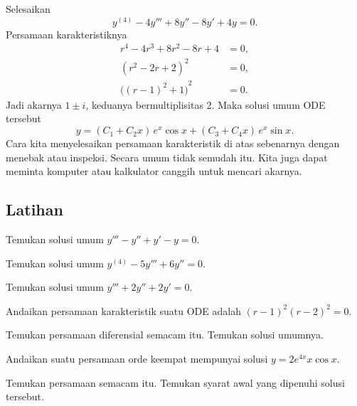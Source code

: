\begin{example}
Selesaikan
\begin{equation*}
y^{(4)} - 4 y''' + 8 y'' - 8 y' + 4y = 0 .
\end{equation*}
Persamaan karakteristiknya
\begin{align*}
r^4 - 4 r^3 + 8 r^2 - 8 r + 4 & = 0 , \\
{(r^2-2r+2)}^2 & = 0 , \\
{\bigl({(r-1)}^2+1\bigr)}^2 & = 0 .
\end{align*}
Jadi akarnya $1 \pm i$, keduanya bermultiplisitas 2. Maka solusi umum ODE tersebut
\begin{equation*}
y =
( C_1 + C_2 x ) \, e^{x} \cos x
+
( C_3 + C_4 x ) \, e^{x} \sin x .
\end{equation*}
Cara kita menyelesaikan persamaan karakteristik di atas sebenarnya dengan menebak atau inspeksi. Secara umum tidak semudah itu. Kita juga dapat meminta komputer atau kalkulator canggih untuk mencari akarnya.
\end{example}


\subsection{Latihan}

\begin{exercise}
Temukan solusi umum $y''' - y'' + y' - y = 0$.
\end{exercise}

\begin{exercise}
Temukan solusi umum $y^{(4)} - 5 y''' + 6 y'' = 0$.
\end{exercise}

\begin{exercise}
Temukan solusi umum $y''' + 2 y'' + 2 y' = 0$.
\end{exercise}

\begin{exercise}
Andaikan persamaan karakteristik suatu ODE adalah ${(r-1)}^2{(r-2)}^2 = 0$.
\begin{tasks}
\task Temukan persamaan diferensial semacam itu.
\task Temukan solusi umumnya.
\end{tasks}
\end{exercise}

\begin{exercise} \label{hol:eqfromsolex}
Andaikan suatu persamaan orde keempat mempunyai solusi $y = 2 e^{4x} x \cos x$.
\begin{tasks}
\task Temukan persamaan semacam itu.
\task Temukan syarat awal yang dipenuhi solusi tersebut.
\end{tasks}
\end{exercise}

